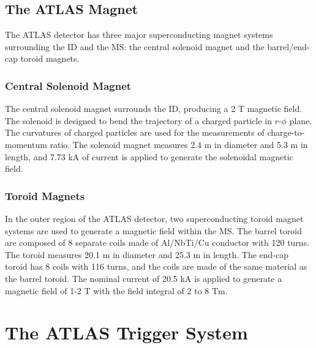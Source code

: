 \subsection{The ATLAS Magnet}
\label{sec:atlas:magnet}

The ATLAS detector has three major superconducting magnet systems surrounding the ID and the MS: the central solenoid magnet and the barrel/end-cap toroid magnets.

\subsubsection{Central Solenoid Magnet}
\label{sec:atlas:solenoid}
The central solenoid magnet surrounds the ID, producing a 2 T magnetic field. The solenoid is designed to bend the trajectory of a charged particle in $r$-$\phi$ plane. The curvatures of charged particles are used for the measurements of charge-to-momentum ratio. The solenoid magnet measures 2.4 \si{\meter} in diameter and 5.3 \si{\meter} in length, and 7.73 \si{\kilo\ampere} of current is applied to generate the solenoidal magnetic field.


\subsubsection{Toroid Magnets}
\label{sec:atlas:toroid}

In the outer region of the ATLAS detector, two superconducting toroid magnet systems are used to generate a magnetic field within the MS. The barrel toroid are composed of 8 separate coils made of Al/NbTi/Cu conductor with 120 turns. The toroid measures 20.1 \si{\meter} in diameter and 25.3 \si{\meter} in length. The end-cap toroid has 8 coils with 116 turns, and the coils are made of the same material as the barrel toroid. The nominal current of 20.5 \si{\kilo\ampere} is applied to generate a magnetic field of 1-2 T with the field integral of 2 to 8 Tm.

\section{The ATLAS Trigger System}
\label{sec:atlas:daq}

